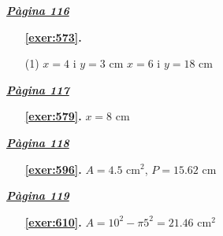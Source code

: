  \vspace{1cm} 
 

\vspace{0.3cm}


\hyperlink{page.116}{\textbf{\em Pàgina 116}}
\begin{enumerate}



 \item[\fontfamily{phv}\selectfont\color{blue}\textbf{\ref{exer:573}. }] \label{ans:573}
 \begin{tasks}[column-sep=1em, item-indent=1.3333em](1)
	 \task $x=4$ i $y=3$ cm
	 \task $x=6$ i $y=18$ cm
\end{tasks}
 \end{enumerate}
\vspace{0.3cm}


\hyperlink{page.117}{\textbf{\em Pàgina 117}}
\begin{enumerate}
\item[\fontfamily{phv}\selectfont\color{blue}\textbf{\ref{exer:579}. }] \label{ans:579} 
$x=8$ cm
 \end{enumerate}
\vspace{0.3cm}


\hyperlink{page.118}{\textbf{\em Pàgina 118}}
\begin{enumerate}
\item[\fontfamily{phv}\selectfont\color{blue}\textbf{\ref{exer:596}. }] \label{ans:596} 
$A=4.5$ cm$^2$, $P=15.62$ cm
 \end{enumerate}
\vspace{0.3cm}


\hyperlink{page.119}{\textbf{\em Pàgina 119}}
\begin{enumerate}
\item[\fontfamily{phv}\selectfont\color{blue}\textbf{\ref{exer:610}. }] \label{ans:610} 
$A=10^2-\pi 5^2=21.46$ cm$^2$
 \end{enumerate}
\vspace{0.3cm}


